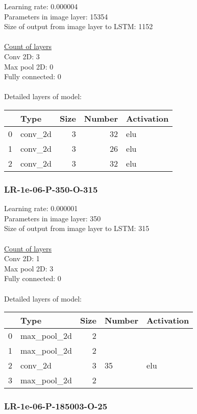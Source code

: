 Learning rate: 0.000004
\\Parameters in image layer: 15354
\\Size of output from image layer to LSTM: 1152
\\\\\underline{Count of layers} 
\\Conv 2D:           3\\Max pool 2D:      0\\Fully connected:  0
\\\\Detailed layers of model: \\\begin{tabular}{rlrrl}
\hline
    & Type    &   Size &   Number & Activation   \\
\hline
  0 & conv\_2d &      3 &       32 & elu          \\
  1 & conv\_2d &      3 &       26 & elu          \\
  2 & conv\_2d &      3 &       32 & elu          \\
\hline
\end{tabular}\subsubsection*{LR-1e-06-P-350-O-315}
Learning rate: 0.000001
\\Parameters in image layer: 350
\\Size of output from image layer to LSTM: 315
\\\\\underline{Count of layers} 
\\Conv 2D:           1\\Max pool 2D:      3\\Fully connected:  0
\\\\Detailed layers of model: \\\begin{tabular}{rlrll}
\hline
    & Type        &   Size & Number   & Activation   \\
\hline
  0 & max\_pool\_2d &      2 &          &              \\
  1 & max\_pool\_2d &      2 &          &              \\
  2 & conv\_2d     &      3 & 35       & elu          \\
  3 & max\_pool\_2d &      2 &          &              \\
\hline
\end{tabular}\subsubsection*{LR-1e-06-P-185003-O-25}
